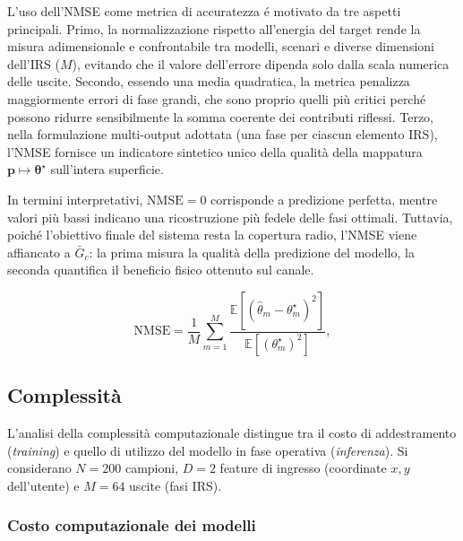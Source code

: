 \documentclass[12pt,a4paper]{report}
\begin{document}
L'uso dell'NMSE come metrica di accuratezza \'e motivato da tre
aspetti principali. Primo, la normalizzazione rispetto all'energia
del target rende la misura adimensionale e confrontabile tra modelli,
scenari e diverse dimensioni dell'IRS ($M$), evitando che il valore
dell'errore dipenda solo dalla scala numerica delle uscite. Secondo,
essendo una media quadratica, la metrica penalizza maggiormente
errori di fase grandi, che sono proprio quelli pi\`u critici perch\'e
possono ridurre sensibilmente la somma coerente dei contributi
riflessi. Terzo, nella formulazione multi-output adottata (una fase
per ciascun elemento IRS), l'NMSE fornisce un indicatore sintetico
unico della qualit\`a della mappatura $\mathbf{p} \mapsto
\boldsymbol{\theta}^\star$ sull'intera superficie.

In termini interpretativi, $\text{NMSE}=0$ corrisponde a predizione
perfetta, mentre valori pi\`u bassi indicano una ricostruzione pi\`u
fedele delle fasi ottimali. Tuttavia, poich\'e l'obiettivo finale del
sistema resta la copertura radio, l'NMSE viene affiancato a
$\bar{G}_c$: la prima misura la qualit\`a della predizione del
modello, la seconda quantifica il beneficio fisico ottenuto sul canale.

\begin{equation}
  \text{NMSE} = \frac{1}{M} \sum_{m=1}^M
  \frac{\mathbb{E}[(\hat{\theta}_m -
  \theta_m^\star)^2]}{\mathbb{E}[(\theta_m^\star)^2]},
  \label{eq:nmse}
\end{equation}

\subsection{Complessità}

L'analisi della complessità computazionale distingue tra il costo di
addestramento (\emph{training}) e quello di utilizzo del modello in fase
operativa (\emph{inferenza}). Si considerano $N=200$ campioni,
$D=2$ feature di ingresso (coordinate $x,y$ dell'utente) e $M=64$
uscite (fasi IRS).

\subsubsection{Costo computazionale dei modelli}
\end{document}

